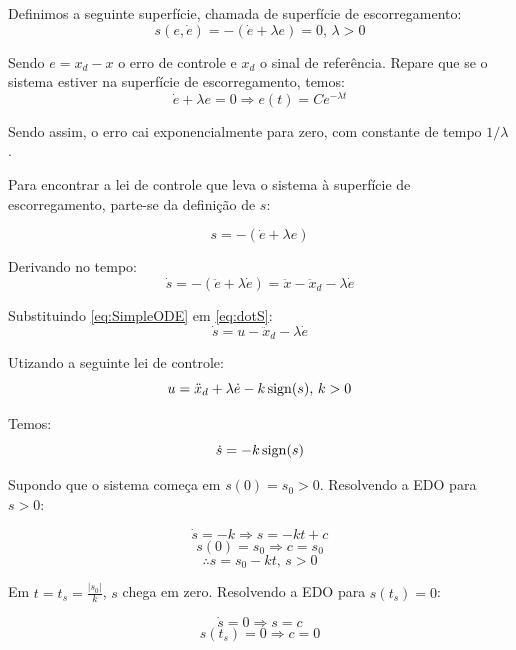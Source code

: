 \documentclass[a4paper,11pt,brazil,fleqn]{article}
\begin{document}
Definimos a seguinte superf\'icie, chamada de superf\'icie de escorregamento:
\begin{equation} \label{eq:SlidingSurface}
s(e, \dot{e}) = - (\dot{e} + \lambda e) = 0, \, \lambda > 0
\end{equation}

Sendo $e = x_d - x$ o erro de controle e $x_d$ o sinal de refer\^encia. Repare que se o sistema estiver na superf\'icie de escorregamento, temos:
\begin{equation} \label{eq:SlidingError}
\dot{e} + \lambda e = 0 \Rightarrow e(t) = C e^{- \lambda t}
\end{equation}

Sendo assim, o erro cai exponencialmente para zero, com constante de tempo $1/\lambda$.

Para encontrar a lei de controle que leva o sistema \`a superf\'icie de escorregamento, parte-se da defini\c{c}\~ao de $s$:

$$ s = -(\dot{e} + \lambda e) $$

Derivando no tempo:
\begin{equation} \label{eq:dotS}
\dot{s} =  -(\ddot{e} + \lambda \dot{e}) = \ddot{x} - \ddot{x}_d - \lambda \dot{e} 
\end{equation}

Substituindo \eqref{eq:SimpleODE} em \eqref{eq:dotS}:
\begin{equation} \label{dotS2}
\dot{s} = u - \ddot{x}_d - \lambda \dot{e}
\end{equation}

Utizando a seguinte lei de controle:
\begin{equation} \label{SMControlLaw1D}
u = \ddot{x}_d + \lambda \dot{e} - k \operatorname*{sign} (s), \, k>0
\end{equation}

Temos:
\begin{equation} \label{CloserLoop1D}
\dot{s} = -k \operatorname*{sign}(s) 
\end{equation}

Supondo que o sistema come\c{c}a em $s(0) = s_0 >0$. Resolvendo a EDO para $s>0$:

$$ \dot{s} = -k \Rightarrow s = -k t + c $$
$$ s(0) = s_0 \Rightarrow c = s_0 $$
$$ \therefore s = s_0 - k t, \, s>0 $$

Em $t = t_s = \frac{|s_0|}{k}$, $s$ chega em zero. Resolvendo a EDO para $s(t_s) = 0$:

$$ \dot{s} = 0 \Rightarrow s =  c $$
$$ s(t_s) = 0 \Rightarrow c = 0 $$
\end{document}
